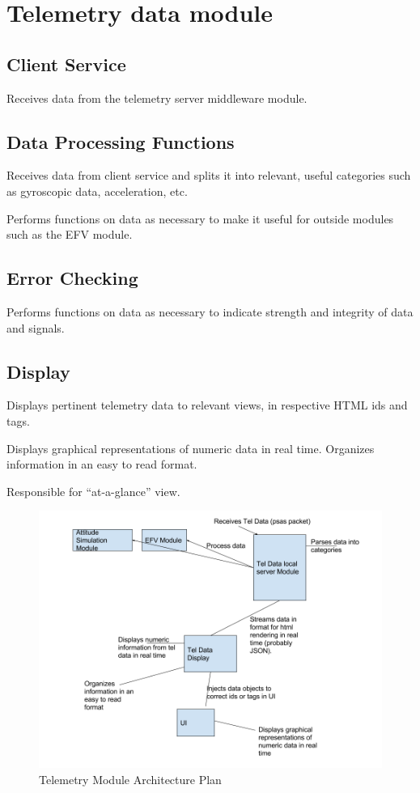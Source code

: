 \section{Telemetry data module}

\subsection{Client Service}
  Receives data from the telemetry server middleware module.

\subsection{Data Processing Functions}
  Receives data from client service and splits it into relevant, useful categories
  such as gyroscopic data, acceleration, etc.

  Performs functions on data as necessary to make it useful for outside modules
  such as the EFV module.

\subsection{Error Checking}
  Performs functions on data as necessary to indicate strength and integrity
  of data and signals.

\subsection{Display}
  Displays pertinent telemetry data to relevant views, in respective
  HTML ids and tags.

  Displays graphical representations of numeric data in real time.
  Organizes information in an easy to read format.

  Responsible for ``at-a-glance'' view.

\begin{figure}[h!]
\centering
\includegraphics[scale=.45]{imgs/tel-data-module.png}
\caption{Telemetry Module Architecture Plan \label{tel}}
\end{figure}
